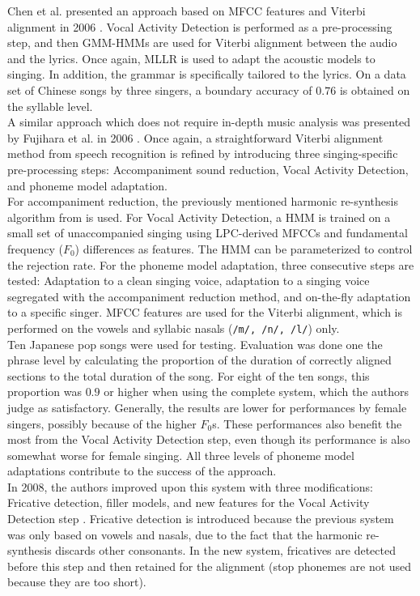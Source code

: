 Chen et al. presented an approach based on MFCC features and Viterbi alignment in 2006 \cite{popular_synchronization}. Vocal Activity Detection is performed as a pre-processing step, and then GMM-HMMs are used for Viterbi alignment between the audio and the lyrics. Once again, MLLR is used to adapt the acoustic models to singing. In addition, the grammar is specifically tailored to the lyrics. On a data set of Chinese songs by three singers, a boundary accuracy of $0.76$ is obtained on the syllable level.\\

A similar approach which does not require in-depth music analysis was presented by Fujihara et al. in 2006 \cite{fujihara_alignment}. Once again, a straightforward Viterbi alignment method from speech recognition is refined by introducing three singing-specific pre-processing steps: Accompaniment sound reduction, Vocal Activity Detection, and phoneme model adaptation.\\
For accompaniment reduction, the previously mentioned harmonic re-synthesis algorithm from \cite{fujihara_identification} is used. For Vocal Activity Detection, a HMM is trained on a small set of unaccompanied singing using LPC-derived MFCCs and fundamental frequency ($F_0$) differences as features. The HMM can be parameterized to control the rejection rate. For the phoneme model adaptation, three consecutive steps are tested: Adaptation to a clean singing voice, adaptation to a singing voice segregated with the accompaniment reduction method, and on-the-fly adaptation to a specific singer. MFCC features are used for the Viterbi alignment, which is performed on the vowels and syllabic nasals (\texttt{/m/, /n/, /l/}) only.\\
Ten Japanese pop songs were used for testing. Evaluation was done one the phrase level by calculating the proportion of the duration of correctly aligned sections to the total duration of the song. For eight of the ten songs, this proportion was $0.9$ or higher when using the complete system, which the authors judge as satisfactory. Generally, the results are lower for performances by female singers, possibly because of the higher $F_0$s. These performances also benefit the most from the Vocal Activity Detection step, even though its performance is also somewhat worse for female singing. All three levels of phoneme model adaptations contribute to the success of the approach.\\
In 2008, the authors improved upon this system with three modifications: Fricative detection, filler models, and new features for the Vocal Activity Detection step \cite{fujihara}. Fricative detection is introduced because the previous system was only based on vowels and nasals, due to the fact that the harmonic re-synthesis discards other consonants. In the new system, fricatives are detected before this step and then retained for the alignment (stop phonemes are not used because they are too short).\\
